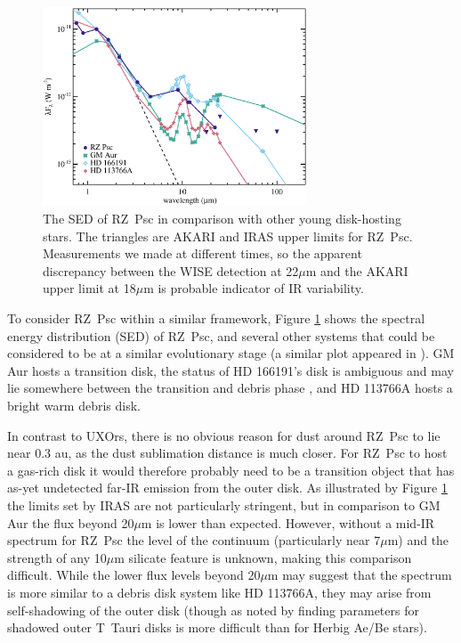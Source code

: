 \documentclass[]{rsos}
\begin{document}
\begin{figure}
  \begin{center}
    \hspace{-0.5cm} \includegraphics[width=0.7\textwidth]{figs/spcomp.eps}
    \caption{The SED of RZ~Psc in comparison with other young disk-hosting stars. The
      triangles are AKARI and IRAS upper limits for RZ~Psc. Measurements we made at
      different times, so the apparent discrepancy between the WISE detection at 22$\mu$m
      and the AKARI upper limit at 18$\mu$m is probable indicator of IR
      variability.}\label{fig:spcomp}
  \end{center}
\end{figure}

To consider RZ~Psc within a similar framework, Figure \ref{fig:spcomp} shows the spectral
energy distribution (SED) of RZ~Psc, and several other systems that could be considered
to be at a similar evolutionary stage (a similar plot appeared in
\cite{2014MNRAS.438.3299K}). GM Aur hosts a transition disk, the status of HD 166191's
disk is ambiguous and may lie somewhere between the transition and debris phase
\cite{2013ApJ...777...78S,2014MNRAS.438.3299K}, and HD 113766A hosts a bright warm debris
disk.

In contrast to UXOrs, there is no obvious reason for dust around RZ~Psc to lie near 0.3
au, as the dust sublimation distance is much closer. For RZ~Psc to host a gas-rich disk
it would therefore probably need to be a transition object that has as-yet undetected
far-IR emission from the outer disk. As illustrated by Figure \ref{fig:spcomp} the limits
set by IRAS are not particularly stringent, but in comparison to GM Aur the flux beyond
20$\mu$m is lower than expected. However, without a mid-IR spectrum for RZ~Psc the level
of the continuum (particularly near 7$\mu$m) and the strength of any 10$\mu$m silicate
feature is unknown, making this comparison difficult. While the lower flux levels beyond
20$\mu$m may suggest that the spectrum is more similar to a debris disk system like HD
113766A, they may arise from self-shadowing of the outer disk (though as noted by
\cite{2003ApJ...594L..47D} finding parameters for shadowed outer T~Tauri disks is more
difficult than for Herbig Ae/Be stars).
\end{document}
